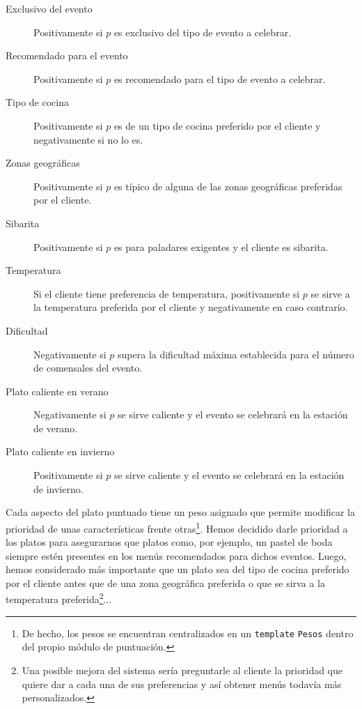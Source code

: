 \begin{description}
\item[Exclusivo del evento] Positivamente si $p$ es exclusivo del tipo de evento a celebrar.
\item[Recomendado para el evento] Positivamente si $p$ es recomendado para el tipo de evento a celebrar.
\item[Tipo de cocina] Positivamente si $p$ es de un tipo de cocina preferido por el cliente y negativamente si no lo es.
\item[Zonas geográficas] Positivamente si $p$ es típico de alguna de las zonas geográficas preferidas por el cliente.
\item[Sibarita] Positivamente si $p$ es para paladares exigentes y el cliente es sibarita.
\item[Temperatura] Si el cliente tiene preferencia de temperatura, positivamente si $p$ se sirve a la temperatura preferida por el cliente
y negativamente en caso contrario.
\item[Dificultad] Negativamente si $p$ supera la dificultad máxima establecida para el número de comensales del evento.
\item[Plato caliente en verano] Negativamente si $p$ se sirve caliente y el evento se celebrará en la estación de verano.
\item[Plato caliente en invierno] Positivamente si $p$ se sirve caliente y el evento se celebrará en la estación de invierno.
\end{description}

Cada aspecto del plato puntuado tiene un peso asignado que permite modificar la prioridad de unas características frente 
otras\footnote{De hecho, los pesos se encuentran centralizados en un \texttt{template} \texttt{Pesos} dentro del propio módulo de
puntuación.}. Hemos decidido darle prioridad a los platos  para asegurarnos que platos como, por ejemplo,
un pastel de boda siempre estén presentes en los menús recomendados para dichos eventos. Luego, hemos considerado más importante
que un plato sea del tipo de cocina preferido por el cliente antes que de una zona geográfica preferida o que se sirva a la
temperatura preferida\footnote{Una posible mejora del sistema sería preguntarle al cliente la prioridad que quiere dar a cada una de
sus preferencias y así obtener menús todavía más personalizados.}...
